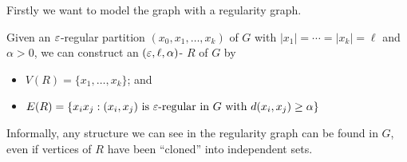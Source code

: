 \documentclass[main.tex]{subfiles}
\begin{document}
Firstly we want to model the graph with a regularity graph.
\begin{definition*}
  Given an $\varepsilon$-regular partition $(x_0,x_1,\ldots,x_k)$ of $G$ with
  $|x_1| = \cdots = |x_k| = \ell$ and $\alpha > 0$, we can construct an
  $(\varepsilon,\ell,\alpha)$- $R$ of $G$ by
  \begin{itemize}
    \item $V(R) = \{x_1,\ldots,x_k\}$; and
    \item $E(R) = \{x_ix_j : (x_i,x_j)\text{ is $\varepsilon$-regular in $G$ with }
      d(x_i,x_j)\geq\alpha\}$
  \end{itemize}
\end{definition*}
Informally, any structure we can see in the regularity graph can be found in $G$,
even if vertices of $R$ have been ``cloned'' into independent sets.
\end{document}
